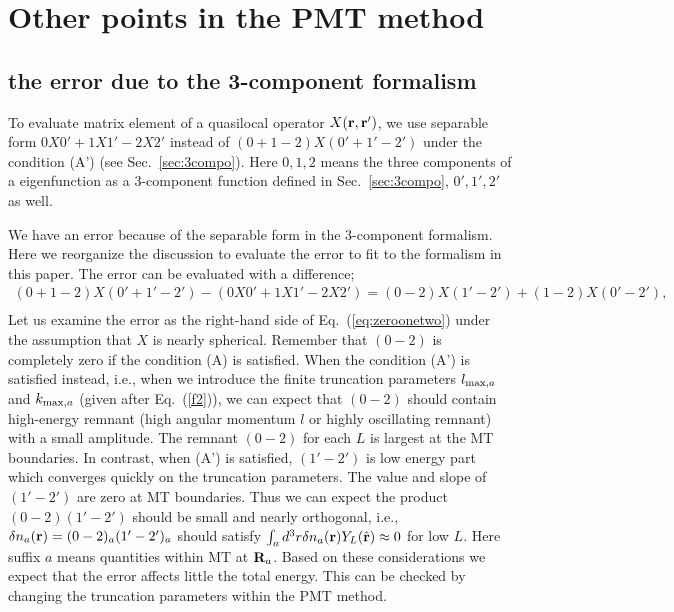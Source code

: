\documentclass[a4paper,10pt,aip,onecolumn,amsmath,amssymb,floatfix,rmp]{revtex4-1}
\newcommand{\bfr}{{\bf r}}
\newcommand{\bfR}{{\bf R}}
\newcommand{\req}[1]{\mbox{Eq.~\!(\ref{#1})}}
\newcommand{\refsec}[1]{\mbox{Sec.~\!\ref{#1}}}
\begin{document}
\section{Other points in the PMT method}
\subsection{the error due to the 3-component formalism}
\label{sec:zeroonetwo}
To evaluate matrix element of a quasilocal operator
$X(\bfr,\bfr')$, we use separable form $0X 0'+1 X 1'-2 X 2'$
instead of $(0+1-2)X(0'+1'-2')$ under the condition (A') 
(see \refsec{sec:3compo}). Here $0,1,2$ means the three components of 
a eigenfunction as a 3-component function defined in
\refsec{sec:3compo}, $0',1',2'$ as well.

We have an error because of the separable form in the 3-component formalism.
Here we reorganize the discussion to evaluate the error
\cite{soler89,PAW} to fit to the formalism in this paper.
The error can be evaluated with a difference;
\begin{eqnarray}
(0+1-2)X(0'+1'-2')-(0X 0'+1 X 1'-2 X 2') 
= (0-2)X(1'-2')+(1-2)X(0'-2'), \nonumber \\
\label{eq:zeroonetwo}
\end{eqnarray}
Let us examine the error as the right-hand side of
\req{eq:zeroonetwo} under the assumption that $X$ is nearly spherical.
Remember that $(0-2)$ is completely zero if the condition (A) is
satisfied. When the condition (A') is satisfied instead, 
i.e., when we introduce the finite truncation parameters 
$l_{{\rm max},a}$ and $k_{{\rm max},a}$ (given after \req{f2}), 
we can expect that $(0-2)$ should contain high-energy remnant
(high angular momentum $l$ or highly oscillating remnant) with a small amplitude.
The remnant $(0-2)$ for each $L$ is largest at the MT boundaries.
In contrast, when (A') is satisfied, $(1'-2')$ is low energy part which  
converges quickly on the truncation parameters. 
The value and slope of $(1'-2')$ are zero at MT boundaries.
Thus we can expect the product $(0-2)(1'-2')$ should be small and
nearly orthogonal, i.e.,
$\delta n_a(\bfr)=(0-2)_a(1'-2')_a$ should satisfy $\int_a d^3 r\delta
n_a(\bfr)Y_L(\hat{\bfr}) \approx 0$ for low $L$.
Here suffix $a$ means quantities within MT at $\bfR_a$.
Based on these considerations we expect that the error affects little 
the total energy.
This can be checked by changing the truncation parameters within the PMT method.
\end{document}
